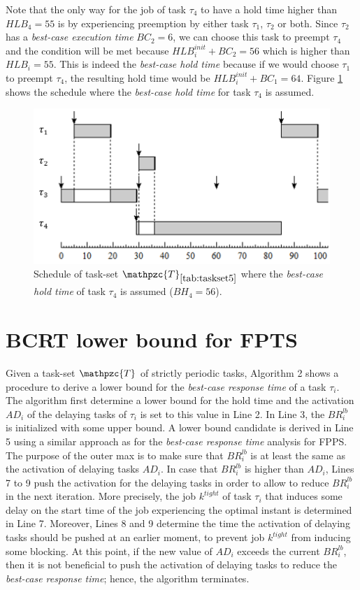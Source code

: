 \documentclass[fleqn]{article}
\begin{document}
Note that the only way for the job of task $\tau_4$ to have a hold time higher than $HLB_4=55$ is by experiencing preemption by either task $\tau_1$, $\tau_2$ or both. Since $\tau_2$ has a \textit{best-case execution time} $BC_2=6$, we can choose this task to preempt $\tau_4$ and the condition will be met because $HLB^{init}_i+BC_2= 56$ which is higher than $HLB_i = 55$. This is indeed the \textit{best-case hold time} because if we would choose $\tau_1$ to preempt $\tau_4$, the resulting hold time would be $HLB^{init}_i+BC_1= 64$. Figure \ref{fig:bcht_2} shows the schedule where the \textit{best-case hold time} for task $\tau_4$ is assumed.

\begin{figure}[H]
	\centering
	\includegraphics[width=0.7\linewidth]{figures/bcht_2}
	\caption{Schedule of task-set $\mathpzc{T}_{\ref{tab:taskset5}}$ where the \textit{best-case hold time} of task $\tau_4$ is assumed ($BH_4 = 56$).}
	\label{fig:bcht_2}
\end{figure}

\section{BCRT lower bound for FPTS}
Given a task-set $\mathpzc{T}$ of strictly periodic tasks, Algorithm 2 shows a procedure to derive a lower bound for the \textit{best-case response time} of a task $\tau_i$. The algorithm first determine a lower bound for the hold time and the activation $AD_i$ of the delaying tasks of $\tau_i$ is set to this value in Line 2. In Line 3, the $BR^{lb}_i$ is initialized with some upper bound. A lower bound candidate is derived in Line 5 using a similar approach as for the \textit{best-case response time} analysis for FPPS. The purpose of the outer max is to make sure that $BR^{lb}_i$ is at least the same as the activation of delaying tasks $AD_i$. In case that $BR^{lb}_i$ is higher than $AD_i$, Lines 7 to 9 push the activation for the delaying tasks in order to allow to reduce $BR^{lb}_i$ in the next iteration. More precisely, the job $k^{tight}$ of task $\tau_i$ that induces some delay on the start time of the job experiencing the optimal instant is determined in Line 7. Moreover, Lines 8 and 9 determine the time the activation of delaying tasks should be pushed at an earlier moment, to prevent job $k^{tight}$ from inducing some blocking. At this point, if the new value of $AD_i$ exceeds the current $BR^{lb}_i$, then it is not beneficial to push the activation of delaying tasks to reduce the \textit{best-case response time}; hence, the algorithm terminates.
\end{document}
